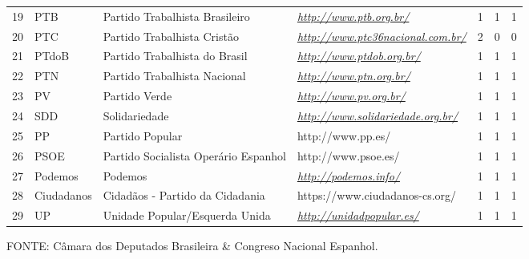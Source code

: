\begin{longtable}[]{@{}lllllll@{}}
19 & PTB & Partido Trabalhista Brasileiro &
\href{http://www.ptb.org.br/}{\emph{http://www.ptb.org.br/}} & 1 & 1 &
1\tabularnewline
20 & PTC & Partido Trabalhista Cristão &
\href{http://www.ptc36nacional.com.br/}{\emph{http://www.ptc36nacional.com.br/}}
& 2 & 0 & 0\tabularnewline
21 & PTdoB & Partido Trabalhista do Brasil &
\href{http://www.ptdob.org.br/}{\emph{http://www.ptdob.org.br/}} & 1 & 1
& 1\tabularnewline
22 & PTN & Partido Trabalhista Nacional &
\href{http://www.ptn.org.br/}{\emph{http://www.ptn.org.br/}} & 1 & 1 &
1\tabularnewline
23 & PV & Partido Verde &
\href{http://www.pv.org.br/}{\emph{http://www.pv.org.br/}} & 1 & 1 &
1\tabularnewline
24 & SDD & Solidariedade &
\href{http://www.solidariedade.org.br/}{\emph{http://www.solidariedade.org.br/}}
& 1 & 1 & 1\tabularnewline
25 & PP & Partido Popular & http://www.pp.es/ & 1 & 1 & 1\tabularnewline
26 & PSOE & Partido Socialista Operário Espanhol & http://www.psoe.es/ &
1 & 1 & 1\tabularnewline
27 & Podemos & Podemos &
\href{http://podemos.info/}{\emph{http://podemos.info/}} & 1 & 1 &
1\tabularnewline
28 & Ciudadanos & Cidadãos - Partido da Cidadania &
https://www.ciudadanos-cs.org/ & 1 & 1 & 1\tabularnewline
29 & UP & Unidade Popular/Esquerda Unida &
\href{http://unidadpopular.es/}{\emph{http://unidadpopular.es/}} & 1 & 1
& 1\tabularnewline
\bottomrule
\end{longtable}

FONTE: Câmara dos Deputados Brasileira \& Congreso Nacional Espanhol.

